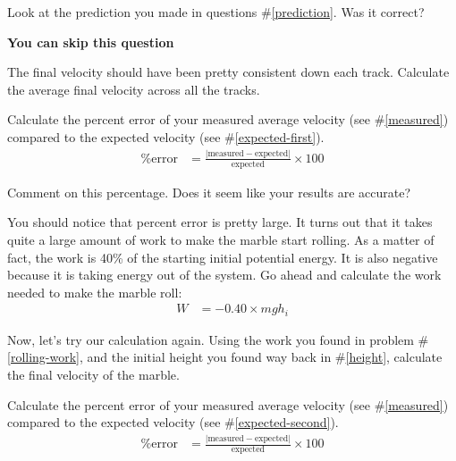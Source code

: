\documentclass[10pt]{exam}
\begin{document}
\begin{questions}

\question
  Look at the prediction you made in questions \#\ref{prediction}. Was it correct? 

  \begin{solution}[\stretch{1}]
    {\color{red} \bf You can skip this question}
  \end{solution}
 
\question \label{measured}
  The final velocity should have been pretty consistent down each track.  Calculate the average final velocity across all the tracks.


\question
  Calculate the percent error of your measured average velocity (see \#\ref{measured}) compared to the expected velocity (see \#\ref{expected-first}).
  \begin{align*}
    \text{\% error} &=  
    \frac{
      \left|\text{measured}-\text{expected}\right|
      }{
        \text{expected}
      } 
    \times 100
  \end{align*}
  \vs 

\question
  Comment on this percentage.  Does it seem like your results are accurate?
  \vs 

\question \label{rolling-work}
  You should notice that percent error is pretty large.  It turns out that it takes quite a large amount of work to make the marble start rolling.  As a matter of fact, the work is 40\% of the starting initial potential energy.  It is also negative because it is taking energy out of the system.  Go ahead and calculate the work needed to make the marble roll:
  \begin{align*}
    W &= -0.40 \times mgh_i
  \end{align*}
  \vs  

\pagebreak


\question \label{expected-second}
  Now, let's try our calculation again.  Using the work you found in problem \#\ref{rolling-work}, and the initial height you found way back in \#\ref{height}, calculate the final velocity of the marble.
  \vs[2] 


\question 
  Calculate the percent error of your measured average velocity (see \#\ref{measured}) compared to the expected velocity (see \#\ref{expected-second}).
  \begin{align*}
    \text{\% error} &=  
    \frac{
      \left|\text{measured}-\text{expected}\right|
      }{
        \text{expected}
      } 
    \times 100
  \end{align*}
  \vs 


\end{questions}
\end{document}
